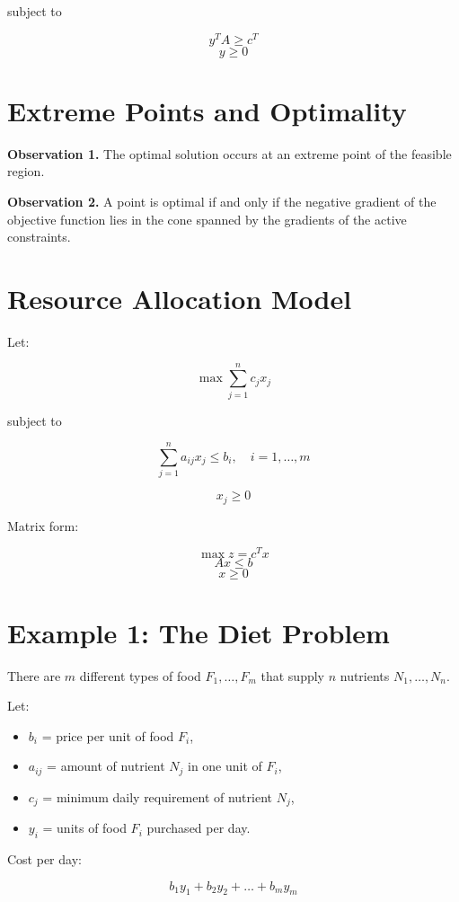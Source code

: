 \documentclass[12pt]{article}
\begin{document}
subject to

\[
y^T A \ge c^T
\]
\[
y \ge 0
\]

\section{Extreme Points and Optimality}

\textbf{Observation 1.}  
The optimal solution occurs at an extreme point of the feasible region.

\textbf{Observation 2.}  
A point is optimal if and only if the negative gradient of the objective function lies in the cone spanned by the gradients of the active constraints.

\section{Resource Allocation Model}

Let:

\[
\max \sum_{j=1}^n c_j x_j
\]

subject to

\[
\sum_{j=1}^n a_{ij} x_j \le b_i, \quad i = 1,\dots,m
\]

\[
x_j \ge 0
\]

Matrix form:

\[
\max z = c^T x
\]
\[
Ax \le b
\]
\[
x \ge 0
\]


\section{Example 1: The Diet Problem}

There are $m$ different types of food $F_1,\dots,F_m$ that supply $n$ nutrients
$N_1,\dots,N_n$.

Let:
\begin{itemize}
\item $b_i$ = price per unit of food $F_i$,
\item $a_{ij}$ = amount of nutrient $N_j$ in one unit of $F_i$,
\item $c_j$ = minimum daily requirement of nutrient $N_j$,
\item $y_i$ = units of food $F_i$ purchased per day.
\end{itemize}

Cost per day:

\[
b_1 y_1 + b_2 y_2 + \dots + b_m y_m
\tag{1}
\]
\end{document}
